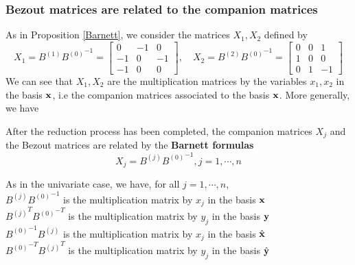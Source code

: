 \documentclass{standalone}
\begin{document}
\subsubsection{Bezout matrices are related to the companion matrices}
As in Proposition \ref{Barnett}, we consider the matrices $X_1, X_2$ defined by
\begin{equation}
	X_1 = B^{(1)}{B^{(0)}}^{-1} =
	\begin{bmatrix}
		0 & -1 & 0\\
		-1 & 0 & -1\\
		-1 & 0 & 0
	\end{bmatrix},\quad
	X_2 = B^{(2)}{B^{(0)}}^{-1} =
	\begin{bmatrix}
		0 & 0 & 1\\
		1 & 0 & 0\\
		0 & 1 & -1
	\end{bmatrix}
\end{equation}
We can see that $X_1, X_2$ are the multiplication matrices by the variables $x_1, x_2$ in the basis $\bold{x}$, i.e the companion matrices associated to the basis $\bold{x}$. More generally, we have
\begin{prop}
\label{Barnett_multi}
After the reduction process has been completed, the companion matrices $X_j$ and the Bezout matrices are related by the {\bf Barnett formulas}
\begin{equation}
	X_j = B^{(j)}{B^{(0)}}^{-1}, j = 1,\cdots, n
\end{equation}
\end{prop}

\begin{rem}
As in the univariate case, we have, for all $j=1,\cdots,n$,\\
$B^{(j)}{B^{(0)}}^{-1}$ is the multiplication matrix by $x_j$ in the basis $\bold{x}$ \\
${B^{(j)}}^{T}{B^{(0)}}^{-T}$ is the multiplication matrix by $y_j$ in the basis $\bold{y}$ \\
${B^{(0)}}^{-1}{B^{(j)}}$  is the multiplication matrix by $x_j$ in the basis $\hat{\bold{x}}$ \\
${B^{(0)}}^{-T}{B^{(j)}}^{T}$  is the multiplication matrix by $y_j$ in the basis $\hat{\bold{y}}$
\end{rem}
\end{document}

